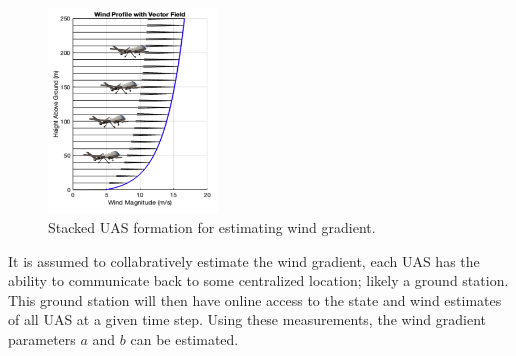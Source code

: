 \begin{figure}[h]  
    \centering
    \includegraphics[width=0.4\textwidth]{images/stacked.png}
    \caption{Stacked UAS formation for estimating wind gradient.}
    \label{fig:stacked_formation}
\end{figure}



It is assumed to collabratively estimate the wind gradient, each UAS has the ability to communicate back to some centralized location; likely a ground station.
This ground station will then have online access to the state and wind estimates of all UAS at a given time step. 
Using these measurements, the wind gradient parameters $a$ and $b$ can be estimated.

